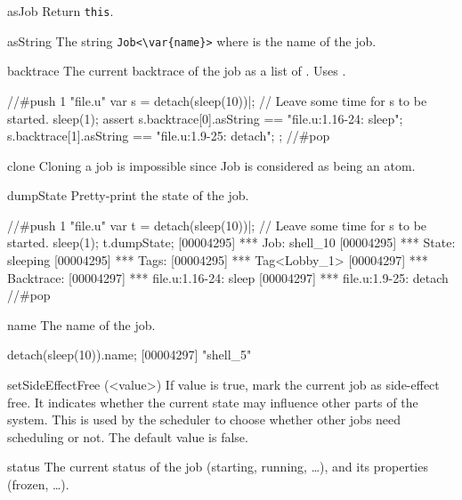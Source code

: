 \begin{urbiscriptapi}
\item[asJob]
  Return \lstinline|this|.

\item[asString] The string \lstinline|Job<\var{name}>| where  is
  the name of the job.

\item[backtrace] The current backtrace of the job as a list of
  .  Uses .

\begin{urbiscript}
//#push 1 "file.u"
var s = detach(sleep(10))|;
// Leave some time for s to be started.
sleep(1);
assert
{
  s.backtrace[0].asString == "file.u:1.16-24: sleep";
  s.backtrace[1].asString == "file.u:1.9-25: detach";
};
//#pop
\end{urbiscript}

\item[clone]
  Cloning a job is impossible since Job is considered as being an atom.

\item[dumpState]
  Pretty-print the state of the job.

\begin{urbiscript}
//#push 1 "file.u"
var t = detach(sleep(10))|;
// Leave some time for s to be started.
sleep(1);
t.dumpState;
[00004295] *** Job: shell_10
[00004295] ***   State: sleeping
[00004295] ***   Tags:
[00004295] ***     Tag<Lobby_1>
[00004297] ***   Backtrace:
[00004297] ***     file.u:1.16-24: sleep
[00004297] ***     file.u:1.9-25: detach
//#pop
\end{urbiscript}

\item[name]  The name of the job.
\begin{urbiscript}
detach(sleep(10)).name;
[00004297] "shell_5"
\end{urbiscript}

\item[setSideEffectFree](<value>)
  If value is true, mark the current job as side-effect free. It indicates
  whether the current state may influence other parts of the system. This is
  used by the scheduler to choose whether other jobs need scheduling or not.
  The default value is false.

\item[status]
  The current status of the job (starting, running, \ldots), and its
  properties (frozen, \ldots).


\end{urbiscriptapi}

